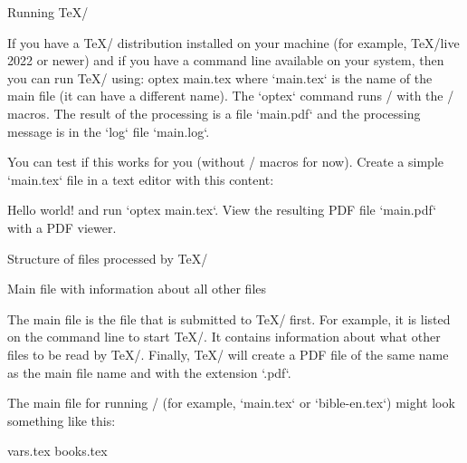 


\sec Running \TeX/

If you have a \TeX/ distribution installed on your machine (for example, \TeX/live
2022 or newer) %
and if you have a command line available on your system, then you can run \TeX/ using:
\begtt
optex main.tex
\endtt
where `main.tex` is the name of the main file (it can have a different name). 
The `optex` command runs \LuaTeX/ with the \OpTeX/ macros. The result of the processing is a file 
`main.pdf` and the processing message is in the `log` file `main.log`.

You can test if this works for you (without \OpBible/ macros for now). Create a simple `main.tex` 
file in a text editor with this content:

\begtt
\fontfam[lm]
Hello world!
\bye
\endtt
and run `optex main.tex`. View the resulting PDF file `main.pdf` with a PDF viewer.


\sec Structure of files processed by \TeX/

\secc[main] Main file with information about all other files

The main file is the file that is submitted to \TeX/ first. For example, it is
listed on the command line to start \TeX/. It contains information about what
other files to be read by \TeX/. Finally, \TeX/ will create a PDF file of the same
name as the main file name and with the extension `.pdf`.

The main file for running \OpBible/ (for example, `main.tex` or `bible-en.tex`) might look something like this:

\begtt
\load[opbible] %
\enlang %

\def\tmark {BBE}      %

 {vars.tex}  %
 {books.tex} %

\def\txsfile {sources/\tmark-\amark.txs} %
\def\fmtfile {formats/fmt-\tmark-\amark.tex} %
\def\notesfile {notes/notes-\amark.tex} %
\def\introfile {others/intro-\amark.tex} %
\def\articlefile {others/articles-\amark.tex} %

